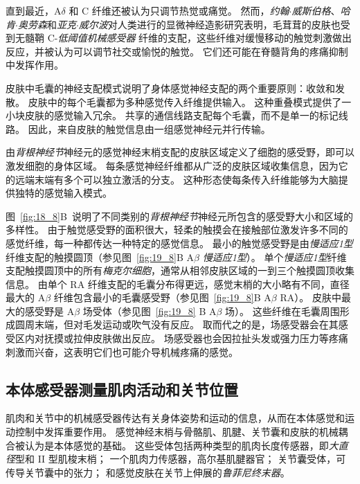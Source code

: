直到最近，A$\delta$ 和 C 纤维还被认为只调节热觉或痛觉。
然而，\textit{约翰$\cdot$威斯伯格}、\textit{哈肯$\cdot$奥劳森}和\textit{亚克$\cdot$威尔波}对人类进行的显微神经造影研究表明，毛茸茸的皮肤也受到无髓鞘 C-\textit{低阈值机械感受器} 纤维的支配，这些纤维对缓慢移动的触觉刺激做出反应，并被认为可以调节社交或愉悦的触觉。
它们还可能在脊髓背角的疼痛抑制中发挥作用。


皮肤中毛囊的神经支配模式说明了身体感觉神经支配的两个重要原则：收敛和发散。
皮肤中的每个毛囊都为多种感觉传入纤维提供输入。
这种重叠模式提供了一小块皮肤的感觉输入冗余。
共享的通信线路支配每个毛囊，而不是单一的标记线路。 
因此，来自皮肤的触觉信息由一组感觉神经元并行传输。


由\textit{背根神经节}神经元的感觉神经末梢支配的皮肤区域定义了细胞的感受野，即可以激发细胞的身体区域。
每条感觉神经纤维都从广泛的皮肤区域收集信息，因为它的远端末端有多个可以独立激活的分支。
这种形态使每条传入纤维能够为大脑提供独特的感觉输入模式。


图~\ref{fig:18_8}B~说明了不同类别的\textit{背根神经节}神经元所包含的感受野大小和区域的多样性。
由于触觉感受野的面积很大，轻柔的触摸会在接触部位激发许多不同的感觉纤维，每一种都传达一种特定的感觉信息。
最小的触觉感受野是由\textit{慢适应1型}纤维支配的触摸圆顶（参见图~\ref{fig:19_8}B A$\beta$ \textit{慢适应1型}）。
单个\textit{慢适应1型}纤维支配触摸圆顶中的所有\textit{梅克尔细胞}，通常从相邻皮肤区域的一到三个触摸圆顶收集信息。
由单个 RA 纤维支配的毛囊分布得更远，感觉末梢的大小略有不同，直径最大的 A$\beta$ 纤维包含最小的毛囊感受野（参见图~\ref{fig:19_8}B A$\beta$ RA）。
皮肤中最大的感受野是 A$\beta$ 场受体（参见图~\ref{fig:19_8} B A$\beta$ 场）。
这些纤维在毛囊周围形成圆周末端，但对毛发运动或吹气没有反应。
取而代之的是，场感受器会在其感受区内对抚摸或拉伸皮肤做出反应。
场感受器也会因拉扯头发或强力压力等疼痛刺激而兴奋，这表明它们也可能介导机械疼痛的感觉。



\subsection{本体感受器测量肌肉活动和关节位置}

肌肉和关节中的机械感受器传达有关身体姿势和运动的信息，从而在本体感觉和运动控制中发挥重要作用。
感觉神经末梢与骨骼肌、肌腱、关节囊和皮肤的机械耦合被认为是本体感觉的基础。
这些受体包括两种类型的肌肉长度传感器，即\textit{大直径}型和 II 型肌梭末梢；
一个肌肉力传感器，高尔基肌腱器官；
关节囊受体，可传导关节囊中的张力；
和感觉皮肤在关节上伸展的\textit{鲁菲尼终末器}。


